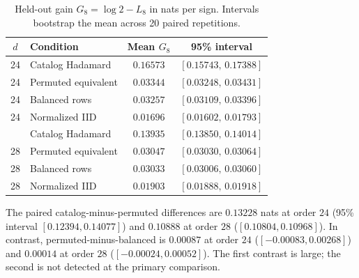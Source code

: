 \documentclass[10pt,twoside]{article}
\theoremstyle{noteplain}
\theoremstyle{definition}
\begin{document}
\begin{table}[ht]
\centering
\caption{Held-out gain $G_8=\log2-L_8$ in nats per sign.  Intervals bootstrap the mean across 20 paired repetitions.}
\label{tab:primary}
\small
\begin{tabular}{@{}clcc@{}}
\toprule
$d$ & Condition & Mean $G_8$ & 95\% interval \\
\midrule
24 & Catalog Hadamard & $0.16573$ & $[0.15743,\,0.17388]$ \\
24 & Permuted equivalent & $0.03344$ & $[0.03248,\,0.03431]$ \\
24 & Balanced rows & $0.03257$ & $[0.03109,\,0.03396]$ \\
24 & Normalized IID & $0.01696$ & $[0.01602,\,0.01793]$ \\
\addlinespace[0.3em]
28 & Catalog Hadamard & $0.13935$ & $[0.13850,\,0.14014]$ \\
28 & Permuted equivalent & $0.03047$ & $[0.03030,\,0.03064]$ \\
28 & Balanced rows & $0.03033$ & $[0.03006,\,0.03060]$ \\
28 & Normalized IID & $0.01903$ & $[0.01888,\,0.01918]$ \\
\bottomrule
\end{tabular}
\end{table}

The paired catalog-minus-permuted differences are $0.13228$ nats at order $24$ (95\% interval $[0.12394,0.14077]$) and $0.10888$ at order $28$ ($[0.10804,0.10968]$).  In contrast, permuted-minus-balanced is $0.00087$ at order $24$ ($[-0.00083,0.00268]$) and $0.00014$ at order $28$ ($[-0.00024,0.00052]$).  The first contrast is large; the second is not detected at the primary comparison.
\end{document}
